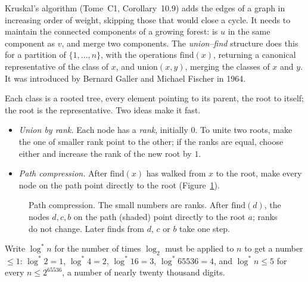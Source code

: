 Kruskal's algorithm (Tome~C1, Corollary~10.9) adds the edges of a graph in increasing order of weight, skipping those that would close a cycle. It needs to
maintain the connected components of a growing forest: is $u$ in the same component as $v$, and merge two components. The \emph{union--find} structure does this
for a partition of $\{1,\dots,n\}$, with the operations $\mathrm{find}(x)$, returning a canonical representative of the class of $x$, and $\mathrm{union}(x,y)$, merging
the classes of $x$ and $y$. It was introduced by Bernard Galler and Michael Fischer in 1964.

Each class is a rooted tree, every element pointing to its parent, the root to itself; the root is the representative. Two ideas make it fast.

\begin{itemize}
\item \emph{Union by rank.} Each node has a \emph{rank}, initially $0$. To unite two roots, make the one of smaller rank point to the other; if the ranks are equal,
choose either and increase the rank of the new root by $1$.
\item \emph{Path compression.} After $\mathrm{find}(x)$ has walked from $x$ to the root, make every node on the path point directly to the root (Figure~\ref{fig:unionfind}).
\end{itemize}

\begin{figure}[ht]
\centering
{}
\caption{Path compression. The small numbers are ranks. After $\mathrm{find}(d)$, the nodes $d,c,b$ on the path (shaded) point directly to the root $a$; ranks do not change.
Later finds from $d$, $c$ or $b$ take one step.}
\label{fig:unionfind}
\end{figure}

Write $\log^*n$ for the number of times $\log_2$ must be applied to $n$ to get a number $\le1$: $\log^*2=1$, $\log^*4=2$, $\log^*16=3$, $\log^*65536=4$, and $\log^*n\le5$ for every
$n\le2^{65536}$, a number of nearly twenty thousand digits.

